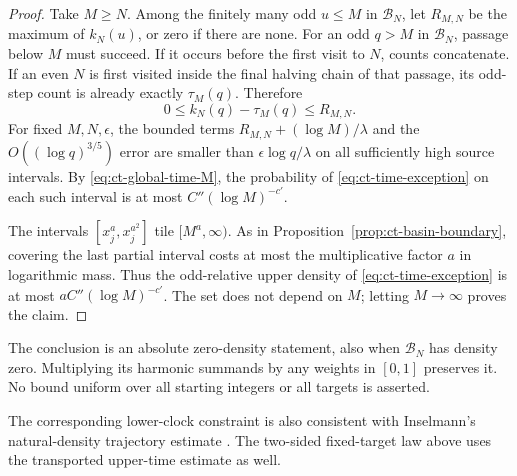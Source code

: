 \documentclass[11pt,a4paper]{article}
\begin{document}
\begin{proof}
Take \(M\ge N\). Among the finitely many odd \(u\le M\) in
\(\mathcal B_N\), let \(R_{M,N}\) be the maximum of \(k_N(u)\),
or zero if there are none. For an odd \(q>M\) in \(\mathcal B_N\),
passage below \(M\) must succeed. If it occurs before the first
visit to \(N\), counts concatenate. If an even \(N\) is first
visited inside the final halving chain of that passage, its odd-step
count is already exactly \(\tau_M(q)\). Therefore
\begin{equation}\label{eq:ct-final-count}
 0\le k_N(q)-\tau_M(q)\le R_{M,N}.
\end{equation}
For fixed \(M,N,\epsilon\), the bounded terms
\(R_{M,N}+(\log M)/\lambda\) and the \(O((\log q)^{3/5})\) error
are smaller than \(\epsilon\log q/\lambda\) on all sufficiently
high source intervals. By \eqref{eq:ct-global-time-M},
the probability of \eqref{eq:ct-time-exception} on each such
interval is at most \(C''(\log M)^{-c'}\).

The intervals \([x_j^a,x_j^{a^2}]\) tile \([M^a,\infty)\).
As in Proposition~\ref{prop:ct-basin-boundary}, covering the last
partial interval costs at most the multiplicative factor \(a\)
in logarithmic mass. Thus the odd-relative upper density of
\eqref{eq:ct-time-exception} is at most
\(aC''(\log M)^{-c'}\). The set does not depend on \(M\);
letting \(M\to\infty\) proves the claim.
\end{proof}

The conclusion is an absolute zero-density statement, also when
\(\mathcal B_N\) has density zero. Multiplying its harmonic
summands by any weights in \([0,1]\) preserves it. No bound
uniform over all starting integers or all targets is asserted.

The corresponding lower-clock constraint is also consistent with
Inselmann's natural-density trajectory estimate
\cite[Theorem~1.10]{Inselmann2024}. The two-sided fixed-target law
above uses the transported upper-time estimate as well.
\end{document}
